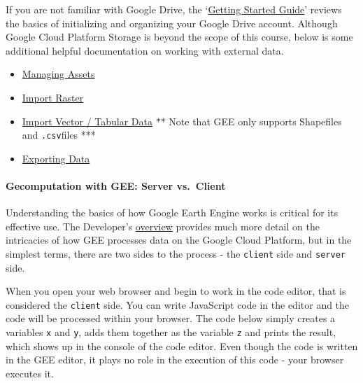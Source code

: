 \documentclass[
]{article}
\providecommand{\tightlist}{%
  \setlength{\itemsep}{0pt}\setlength{\parskip}{0pt}}
\begin{document}
If you are not familiar with Google Drive, the `\href{https://support.google.com/a/users/answer/9282958?hl=en}{Getting Started Guide}' reviews the basics of initializing and organizing your Google Drive account. Although Google Cloud Platform Storage is beyond the scope of this course, below is some additional helpful documentation on working with external data.

\begin{itemize}
\tightlist
\item
  \href{https://developers.google.com/earth-engine/guides/asset_manager}{Managing Assets}
\item
  \href{https://developers.google.com/earth-engine/guides/image_upload}{Import Raster}
\item
  \href{https://developers.google.com/earth-engine/guides/table_upload}{Import Vector / Tabular Data} ** Note that GEE only supports Shapefiles and \texttt{.csv}files ***
\item
  \href{https://developers.google.com/earth-engine/guides/exporting}{Exporting Data}
\end{itemize}

\hypertarget{gecomputation-with-gee-server-vs.-client}{%
\paragraph*{Gecomputation with GEE: Server vs.~Client}\label{gecomputation-with-gee-server-vs.-client}}

Understanding the basics of how Google Earth Engine works is critical for its effective use. The Developer's \href{https://developers.google.com/earth-engine/guides/concepts_overview}{overview} provides much more detail on the intricacies of how GEE processes data on the Google Cloud Platform, but in the simplest terms, there are two sides to the process - the \texttt{client} side and \texttt{server} side.

When you open your web browser and begin to work in the code editor, that is considered the \texttt{client} side. You can write JavaScript code in the editor and the code will be processed within your browser. The code below simply creates a variables \texttt{x} and \texttt{y}, adds them together as the variable \texttt{z} and prints the result, which shows up in the console of the code editor. Even though the code is written in the GEE editor, it plays no role in the execution of this code - your browser executes it.
\end{document}
